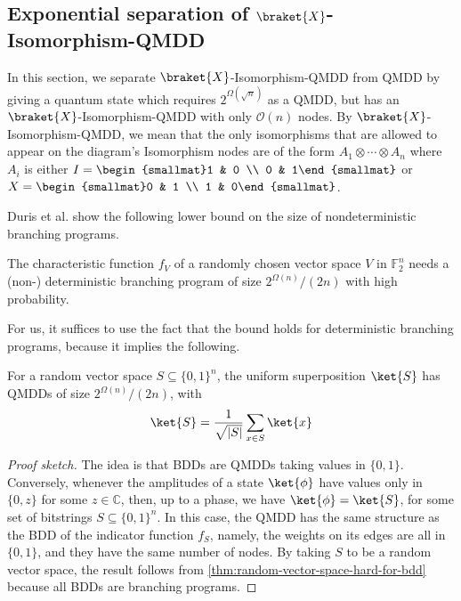 \subsection{Exponential separation of $\braket{X}$-Isomorphism-QMDD}

In this section, we separate $\braket{X}$-Isomorphism-QMDD from QMDD by giving a quantum state which requires $2^{\Omega(\sqrt{n})}$ as a QMDD, but has an $\braket{X}$-Isomorphism-QMDD with only $\mathcal O(n)$ nodes.
By $\braket{X}$-Isomorphism-QMDD, we mean that the only isomorphisms that are allowed to appear on the diagram's Isomorphism nodes are of the form $A_1\otimes\cdots\otimes A_n$ where $A_i$ is either $I=\begin{smallmat}1 & 0 \\ 0 & 1\end{smallmat}$ or $X=\begin{smallmat}0 & 1 \\ 1 & 0\end{smallmat}$.

Duris et al. show the following lower bound on the size of nondeterministic branching programs.
\begin{theorem}
	\label{thm:random-vector-space-hard-for-bdd}
	The characteristic function $f_V$ of a randomly chosen vector space $V$ in $\mathbb F_2^n$ needs a (non-) deterministic branching program of size $2^{\Omega(n)}/(2n)$ with high probability.
\end{theorem}
For us, it suffices to use the fact that the bound holds for deterministic branching programs, because it implies the following.
\begin{theorem}
	For a random vector space $S\subseteq \{0,1\}^n$, the uniform superposition $\ket{S}$ has QMDDs of size $2^{\Omega(n)}/(2n)$, with
	\begin{align}
		\ket{S}= \frac{1}{\sqrt{|S|}} \sum_{x\in S}\ket{x}
	\end{align}
\end{theorem}
\begin{proof}[Proof sketch]
	The idea is that BDDs are QMDDs taking values in $\{0,1\}$.
	Conversely, whenever the amplitudes of a state $\ket{\phi}$ have values only in $\{0,z\}$ for some $z\in \mathbb C$, then, up to a phase, we have $\ket{\phi}=\ket{S}$, for some set of bitstrings $S\subseteq\{0,1\}^n$.
	In this case, the QMDD has the same structure as the BDD of the indicator function $f_S$, namely, the weights on its edges are all in $\{0,1\}$, and they have the same number of nodes.
	By taking $S$ to be a random vector space, the result follows from \autoref{thm:random-vector-space-hard-for-bdd} because all BDDs are branching programs.
\end{proof}

